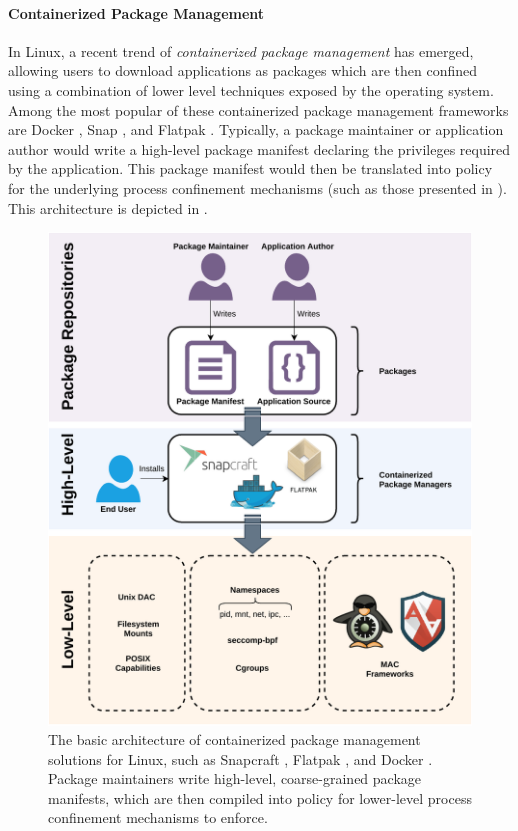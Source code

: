 \documentclass[dvipsnames, 12pt]{article}
\begin{document}
\paragraph*{Containerized Package Management}
In Linux, a recent trend of \textit{containerized package management} has
emerged, allowing users to download applications as packages which are then
confined using a combination of lower level techniques exposed by the operating
system. Among the most popular of these containerized package management
frameworks are Docker \cite{docker}, Snap \cite{snap}, and Flatpak
\cite{flatpak}. Typically, a package maintainer or application author would
write a high-level package manifest declaring the privileges required by the
application. This package manifest would then be translated into policy for the
underlying process confinement mechanisms (such as those presented in
). This architecture is depicted in
.

\begin{figure}[htpb]
    \centering
    \includegraphics[width=0.9\linewidth]{figs/high-level.pdf}
    \caption{
        The basic architecture of containerized package management solutions for
        Linux, such as Snapcraft \cite{snap}, Flatpak \cite{flatpak}, and Docker
        \cite{docker}. Package maintainers write high-level, coarse-grained
        package manifests, which are then compiled into policy for lower-level
        process confinement mechanisms to enforce.
    }%
    \label{fig:containerized}
\end{figure}
\end{document}
